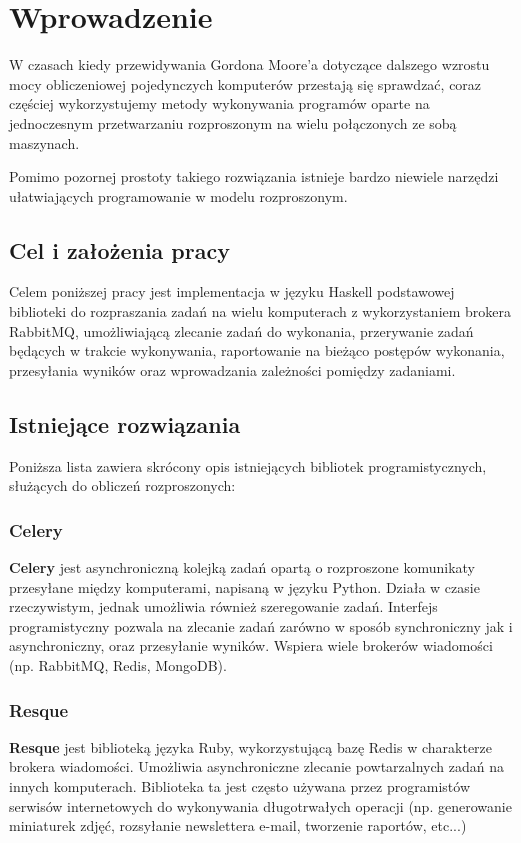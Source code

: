 
\chapter{Wprowadzenie}
\label{cha:wprowadzenie}
W czasach kiedy przewidywania Gordona Moore'a dotyczące dalszego wzrostu mocy obliczeniowej pojedynczych komputerów przestają się sprawdzać, coraz częściej wykorzystujemy metody wykonywania programów oparte na jednoczesnym przetwarzaniu rozproszonym na wielu połączonych ze sobą maszynach. 

Pomimo pozornej prostoty takiego rozwiązania istnieje bardzo niewiele narzędzi ułatwiających programowanie w modelu rozproszonym.

\section{Cel i założenia pracy}
\label{sec:celePracy}
Celem poniższej pracy jest implementacja w języku Haskell podstawowej biblioteki do rozpraszania zadań na wielu komputerach z wykorzystaniem brokera RabbitMQ, umożliwiającą zlecanie zadań do wykonania, przerywanie zadań będących w trakcie wykonywania, raportowanie na bieżąco postępów wykonania, przesyłania wyników oraz wprowadzania zależności pomiędzy zadaniami.

\section{Istniejące rozwiązania}
\label{sec:celePracy}
Poniższa lista zawiera skrócony opis istniejących bibliotek programistycznych, służących do obliczeń rozproszonych:
\subsection{Celery}
\label{ssec:celery}
\textbf{Celery} jest asynchroniczną kolejką zadań opartą o rozproszone komunikaty przesyłane między komputerami, napisaną w języku Python. Działa w czasie rzeczywistym, jednak umożliwia również szeregowanie zadań. Interfejs programistyczny pozwala na zlecanie zadań zarówno w sposób synchroniczny jak i asynchroniczny, oraz przesyłanie wyników. Wspiera wiele brokerów wiadomości (np. RabbitMQ, Redis, MongoDB). 

\subsection{Resque}
\label{ssec:resque}
\textbf{Resque} jest biblioteką języka Ruby, wykorzystującą bazę Redis w charakterze brokera wiadomości. Umożliwia asynchroniczne zlecanie powtarzalnych zadań na innych komputerach. Biblioteka ta jest często używana przez programistów serwisów internetowych do wykonywania długotrwałych operacji (np. generowanie miniaturek zdjęć, rozsyłanie newslettera e-mail, tworzenie raportów, etc...) 

